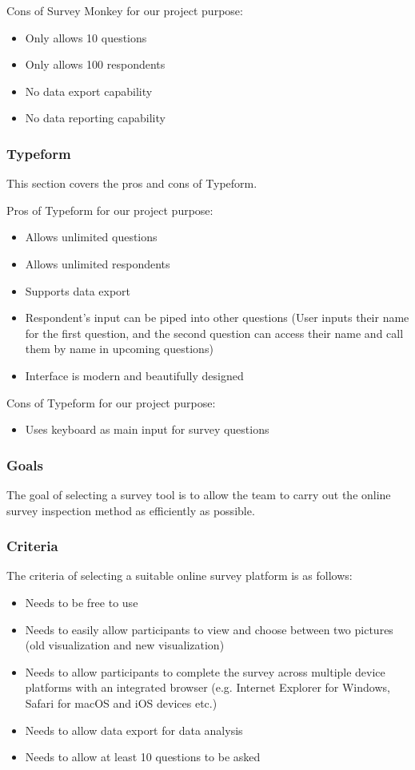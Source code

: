 \documentclass[10pt,journal,compsoc,draftclsnofoot]{IEEEtran}
\begin{document}
Cons of Survey Monkey for our project purpose:
\begin{itemize}
\item Only allows 10 questions
\item Only allows 100 respondents
\item No data export capability
\item No data reporting capability
\end{itemize}

\subsubsection{Typeform}
This section covers the pros and cons of Typeform.

Pros of Typeform for our project purpose:
\begin{itemize}
\item Allows unlimited questions
\item Allows unlimited respondents
\item Supports data export
\item Respondent's input can be piped into other questions (User inputs their name for the first question, and the second question can access their name and call them by name in upcoming questions)
\item Interface is modern and beautifully designed
\end{itemize}

Cons of Typeform for our project purpose:
\begin{itemize}
\item Uses keyboard as main input for survey questions
\end{itemize}

\subsubsection{Goals}
The goal of selecting a survey tool is to allow the team to carry out the online survey inspection method as efficiently as possible.

\subsubsection{Criteria}
The criteria of selecting a suitable online survey platform is as follows:
\begin{itemize}
\item Needs to be free to use
\item Needs to easily allow participants to view and choose between two pictures (old visualization and new visualization)
\item Needs to allow participants to complete the survey across multiple device platforms with an integrated browser (e.g. Internet Explorer for Windows, Safari for macOS and iOS devices etc.)
\item Needs to allow data export for data analysis
\item Needs to allow at least 10 questions to be asked
\end{itemize}
\end{document}
